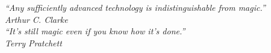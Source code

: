 \documentclass[11pt,a4paper,twoside]{MastersDoctoralThesis}
\author{Andr\'es F. Movilla Obreg\'on}
\begin{document}
\frontmatter
\pagestyle{plain}

\maketitle



\cleardoublepage
\thispagestyle{plain}
\vspace*{5cm}
\begin{flushright}
\itshape ``Any sufficiently advanced technology is indistinguishable from magic.''\\[0.3cm]
\normalfont Arthur C. Clarke\\[1.5cm]
\itshape ``It's still magic even if you know how it's done.''\\[0.3cm]
\normalfont Terry Pratchett
\end{flushright}
\cleardoublepage





\tableofcontents

\listoffigures

\listoftables

\listofalgorithms
{}

\end{document}
